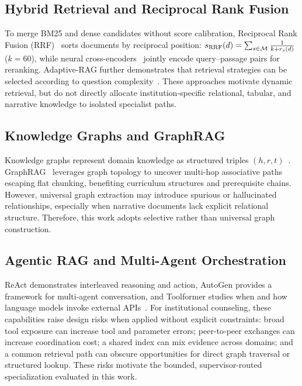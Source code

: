 \subsection{Hybrid Retrieval and Reciprocal Rank Fusion}
\label{sec:hybrid_rrf}

To merge BM25 and dense candidates without score calibration, Reciprocal Rank Fusion (RRF)~\cite{cormack2009rrf} sorts documents by reciprocal position: $s_{\mathrm{RRF}}(d) = \sum_{s \in \mathcal{M}} \frac{1}{k + r_s(d)}$ ($k = 60$), while neural cross-encoders~\cite{nogueira2019bert,xiao2023bge} jointly encode query--passage pairs for reranking. Adaptive-RAG further demonstrates that retrieval strategies can be selected according to question complexity~\cite{jeong2024adaptiverag}. These approaches motivate dynamic retrieval, but do not directly allocate institution-specific relational, tabular, and narrative knowledge to isolated specialist paths.

\subsection{Knowledge Graphs and GraphRAG}
\label{sec:kg_graphrag}

Knowledge graphs represent domain knowledge as structured triples $(h, r, t)$~\cite{pan2024unifying}. GraphRAG~\cite{edge2024graphrag} leverages graph topology to uncover multi-hop associative paths escaping flat chunking, benefiting curriculum structures and prerequisite chains. However, universal graph extraction may introduce spurious or hallucinated relationships, especially when narrative documents lack explicit relational structure. Therefore, this work adopts selective rather than universal graph construction.

\subsection{Agentic RAG and Multi-Agent Orchestration}
\label{sec:agentic_multiagent}

ReAct demonstrates interleaved reasoning and action, AutoGen provides a framework for multi-agent conversation, and Toolformer studies when and how language models invoke external APIs~\cite{yao2023react,wu2023autogen,schick2023toolformer}. For institutional counseling, these capabilities raise design risks when applied without explicit constraints: broad tool exposure can increase tool and parameter errors; peer-to-peer exchanges can increase coordination cost; a shared index can mix evidence across domains; and a common retrieval path can obscure opportunities for direct graph traversal or structured lookup. These risks motivate the bounded, supervisor-routed specialization evaluated in this work.


